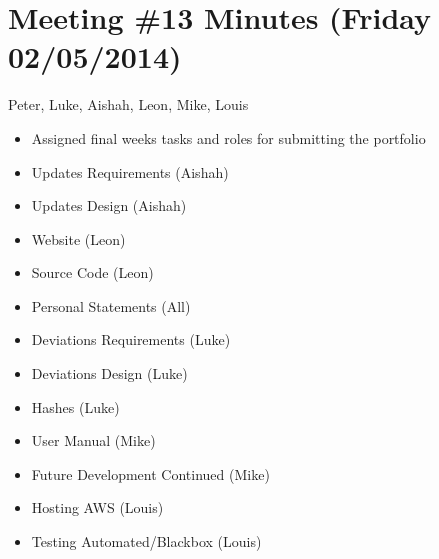 \section{Meeting \#13 Minutes (Friday 02/05/2014)}
Peter, Luke, Aishah, Leon, Mike, Louis
\begin{itemize}
\item Assigned final weeks tasks and roles for submitting the portfolio
\item Updates Requirements (Aishah)
\item Updates Design (Aishah)
\item Website (Leon)
\item Source Code (Leon)
\item Personal Statements (All)
\item Deviations Requirements (Luke)
\item Deviations Design (Luke)
\item Hashes (Luke)
\item User Manual (Mike)
\item Future Development Continued (Mike)
\item Hosting AWS (Louis)
\item Testing Automated/Blackbox (Louis)
\end{itemize}
